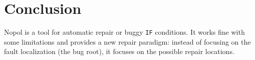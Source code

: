 \section{Conclusion}

\textsf{Nopol} is a tool for automatic repair or buggy \verb!IF! conditions. It works fine with some limitations and provides a new repair paradigm: instead of focusing on the fault localization (the bug root), it focuses on the possible repair locations. 

